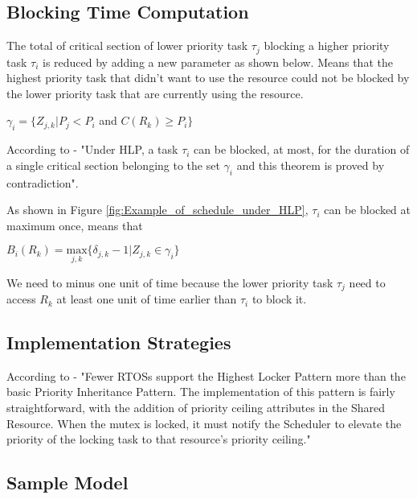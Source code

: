  
\subsection{Blocking Time Computation}

The total of critical section of lower priority task $\tau_{j}$ blocking a higher priority task $\tau_{i}$ is reduced by adding a new parameter as shown below. Means that the highest priority task that didn't want to use the resource could not be blocked by the lower priority task that are currently using the resource.

\begin{center}
$ \gamma_{i}=\{Z_{j,k} | P_{j}<P_{i} $ and $ C(R_{k})\geq P_{i} \} $ \cite{b5}
\end{center}

According to \cite{b5} - "Under HLP, a task $ \tau_{i} $ can be blocked, at most, for the duration of a single critical section belonging to the set $ \gamma_{i} $ and this theorem is proved by contradiction".  

As shown in Figure \ref{fig:Example_of_schedule_under_HLP}, $ \tau_{i} $ can be blocked at maximum once, means that

\begin{center}
$B_{i}(R_{k})=\underset{j,k}{\mathrm{max}} \{ \delta_{j,k}-1 | Z_{j,k} \in \gamma_{i}\}  $ \cite{b5}
\end{center}

We need to minus one unit of time because the lower priority task $ \tau_{j} $ need to access $ R_{k} $ at least one unit of time earlier than $ \tau_{i} $ to block it.

\subsection{Implementation Strategies} 

According to \cite{b6} - "Fewer RTOSs support the Highest Locker Pattern more than the basic Priority Inheritance Pattern. The implementation of this pattern  is fairly straightforward, with the addition of priority ceiling attributes in the Shared Resource. When the mutex is locked, it must notify the Scheduler to elevate the priority of the locking task to that resource's priority ceiling."

\subsection{Sample Model} 

